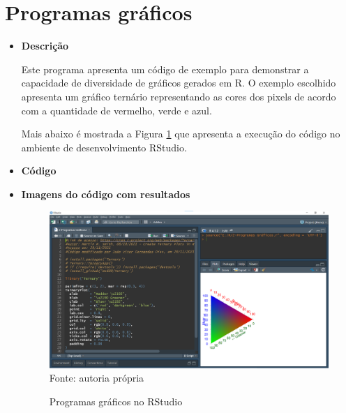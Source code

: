   \section{Programas gráficos}
  \begin{itemize}
  	\item \textbf{Descrição}
  	
  	  Este programa apresenta um código de exemplo para demonstrar a capacidade de diversidade de gráficos gerados em R. O exemplo escolhido apresenta um gráfico ternário representando as cores dos pixels de acordo com a quantidade de vermelho, verde e azul.
  	  
  	  Mais abaixo é mostrada a Figura \ref{Codigo_2a} que apresenta a execução do código no ambiente de desenvolvimento RStudio.
  	  
  	  
  	\item \textbf{Código}
  	
  	
  	\color{blue}
  	
  	\color{black}
  	
  	\item \textbf{Imagens do código com resultados}
  	
	  	\begin{figure}[H]  \label{Codigo_2a}
	  		\centering
	  		\caption{Programas gráficos no RStudio}
	  		\includegraphics[width=16cm]{PicturesJoaoDias/Codigos/Codigo2a.png}
	  		{\tiny \sf Fonte: autoria própria}
	  	\end{figure}

\end{itemize}
